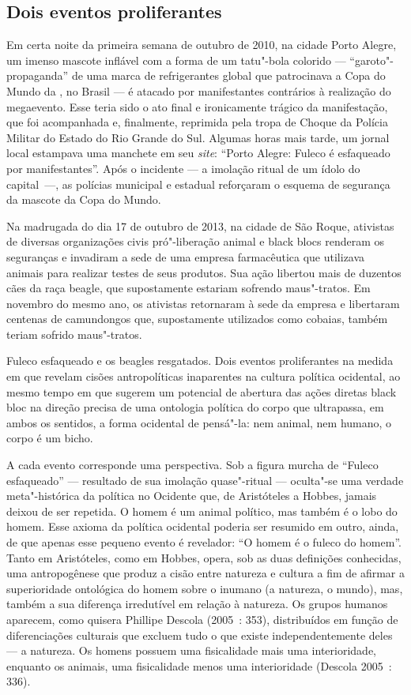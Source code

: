 \subsection{Dois eventos proliferantes}

Em certa noite da primeira semana
de outubro de 2010, na cidade Porto Alegre, um imenso mascote inflável
com a forma de um tatu"-bola colorido --- ``garoto"-propaganda'' de uma
marca de refrigerantes global que patrocinava a Copa do Mundo da ,
no Brasil --- é atacado por manifestantes contrários à realização do
megaevento. Esse teria sido o ato final e ironicamente trágico da
manifestação, que foi acompanhada e, finalmente, reprimida pela tropa de
Choque da Polícia Militar do Estado do Rio Grande do Sul. Algumas horas
mais tarde, um jornal local estampava uma manchete em seu \emph{site}:
``Porto Alegre: Fuleco é esfaqueado por manifestantes''. Após o
incidente --- a imolação ritual de um ídolo do capital~---, as polícias
municipal e estadual reforçaram o esquema de segurança da mascote da
Copa do Mundo.

Na madrugada do dia 17 de outubro de 2013, na cidade de São Roque,
ativistas de diversas organizações civis pró"-liberação animal e black
blocs renderam os seguranças e invadiram a sede de uma empresa
farmacêutica que utilizava animais para realizar testes de seus
produtos. Sua ação libertou mais de duzentos cães da raça beagle,
que supostamente estariam sofrendo maus"-tratos. Em novembro do mesmo
ano, os ativistas retornaram à sede da empresa e libertaram centenas de
camundongos que, supostamente utilizados como cobaias, também teriam
sofrido maus"-tratos.

Fuleco esfaqueado e os beagles resgatados. Dois eventos
proliferantes na medida em que revelam cisões antropolíticas inaparentes
na cultura política ocidental, ao mesmo tempo em que sugerem um
potencial de abertura das ações diretas black bloc na direção precisa de
uma ontologia política do corpo que ultrapassa, em ambos os sentidos, a
forma ocidental de pensá"-la: nem animal, nem humano, o corpo é um bicho.

A cada evento corresponde uma perspectiva. Sob a figura murcha de
``Fuleco esfaqueado'' --- resultado de sua imolação quase"-ritual ---
oculta"-se uma verdade meta"-histórica da política no Ocidente que, de
Aristóteles a Hobbes, jamais deixou de ser repetida. O homem é um animal
político, mas também é o lobo do homem. Esse axioma da política
ocidental poderia ser resumido em outro, ainda, de que apenas esse
pequeno evento é revelador: ``O homem é o fuleco do homem''. Tanto em
Aristóteles, como em Hobbes, opera, sob as duas definições conhecidas,
uma antropogênese que produz a cisão entre natureza e cultura a fim de
afirmar a superioridade ontológica do homem sobre o inumano (a natureza,
o mundo), mas, também a sua diferença irredutível em relação à natureza.
Os grupos humanos aparecem, como quisera Phillipe Descola (2005~: 353),
distribuídos em função de diferenciações culturais que excluem tudo o
que existe independentemente deles --- a natureza. Os homens possuem uma
fisicalidade mais uma interioridade, enquanto os animais, uma
fisicalidade menos uma interioridade (Descola 2005~: 336).

